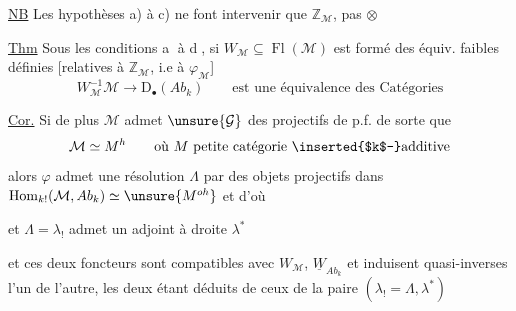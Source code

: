 
\uline{NB} Les hypothèses a) à c) ne font intervenir que $\mathbb Z_{\mathcal M}$, pas $\otimes$

\uline{Thm}  Sous les conditions \textcircled{a} à \textcircled{d}, si
$W_{\mathcal M}\subseteq\operatorname{Fl}(\mathcal M)$ est formé des équiv. faibles définies
 [relatives à $\mathbb Z_{\mathcal M}$, i.e à $\varphi_{\mathcal M}$]
\[
W_{\mathcal M}^{-1}\mathcal M\longrightarrow\mathrm D_\bullet(Ab_k)
\qquad\text{est une équivalence des Catégories}
\]

\uline{Cor.} Si de plus $\mathcal M$ admet 
$\unsure{\mathcal G}$ des  projectifs de p.f.
de sorte que
\[
\mathcal M\simeq M^h\qquad\text{où $M$ petite catégorie \inserted{$k$-}additive}
\]
alors $\varphi$ admet une résolution $\Lambda$ par des objets projectifs
dans $\operatorname{Hom}_{k!}(\mathcal M,Ab_k)\simeq\unsure{M^{oh}}$
 et d'où



et $\Lambda=\lambda_!$ admet un adjoint à droite $\lambda^*$

\deleted{\unsure{$\varphi$}}

et ces deux foncteurs sont compatibles avec $W_{\mathcal M}$,
 $\underline W_{Ab_k}$ et induisent
quasi-inverses l'un de l'autre, les deux
étant déduits de ceux de la paire $(\lambda_!=\Lambda,\lambda^*)$

